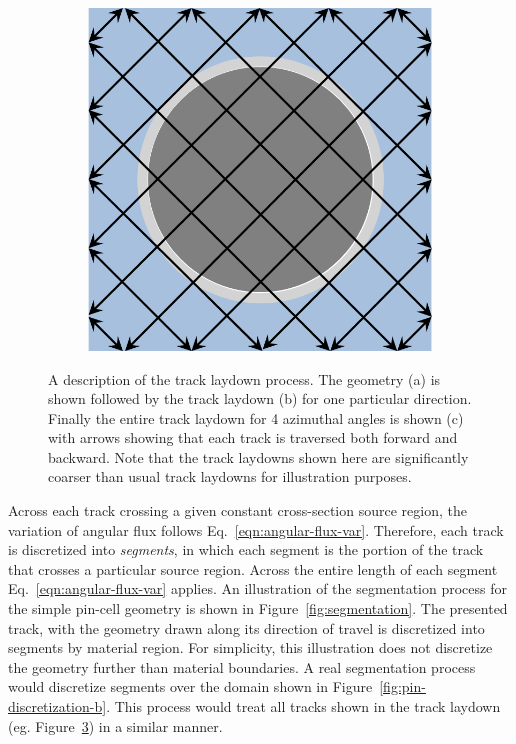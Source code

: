 \begin{figure}[h!]
\begin{subfigure}{0.3\textwidth}
		\caption{}
		\label{fig:track-laydown-b}
	\end{subfigure}
	\begin{subfigure}{0.3\textwidth}
		\centering
		\includegraphics[width=\linewidth]{figures/pin_3.PNG}
		\caption{}
		\label{fig:track-laydown-c}
	\end{subfigure}
	\caption[]{A description of the track laydown process. The geometry (a) is shown followed by the track laydown (b) for one particular direction. Finally the entire track laydown for 4 azimuthal angles is shown (c) with arrows showing that each track is traversed both forward and backward. Note that the track laydowns shown here are significantly coarser than usual track laydowns for illustration purposes.}
	\label{fig:track-laydown}
\end{figure}

Across each track crossing a given constant cross-section source region, the variation of angular flux follows Eq.~\ref{eqn:angular-flux-var}. Therefore, each track is discretized into \textit{segments}, in which each segment is the portion of the track that crosses a particular source region. Across the entire length of each segment Eq.~\ref{eqn:angular-flux-var} applies. An illustration of the segmentation process for the simple pin-cell geometry is shown in Figure~\ref{fig:segmentation}. The presented track, with the geometry drawn along its direction of travel is discretized into segments by material region. For simplicity, this illustration does not discretize the geometry further than material boundaries. A real segmentation process would discretize segments over the domain shown in Figure~\ref{fig:pin-discretization-b}. This process would treat all tracks shown in the track laydown (eg. Figure~\ref{fig:track-laydown}) in a similar manner.

